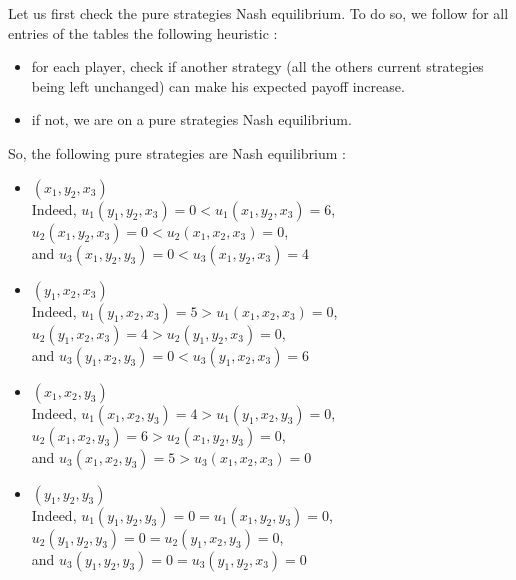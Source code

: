 
Let us first check the pure strategies Nash equilibrium. To do so, we follow for all entries of the tables the following heuristic :
\begin{itemize}
    \item for each player, check if another strategy (all the others current strategies being left unchanged) can make his expected payoff increase.
    \item if not, we are on a pure strategies Nash equilibrium.
\end{itemize}
So, the following pure strategies are Nash equilibrium :
\begin{itemize}
    \item {$(x_1, y_2, x_3) $ \\
    Indeed, $u_1(y_1, y_2, x_3) = 0 < u_1(x_1, y_2, x_3) = 6 $,
    \\ $u_2(x_1, y_2, x_3) = 0 < u_2(x_1, x_2, x_3)= 0 $, \\
    and $u_3(x_1, y_2, y_3) = 0 < u_3(x_1, y_2, x_3) = 4 $}
    \item {$(y_1, x_2, x_3) $ \\
    Indeed, $u_1(y_1, x_2, x_3) = 5 > u_1(x_1, x_2, x_3) = 0 $,
    \\ $u_2(y_1, x_2, x_3) = 4 > u_2(y_1, y_2, x_3)= 0 $, \\
    and $u_3(y_1, x_2, y_3) = 0 < u_3(y_1, x_2, x_3) = 6 $}
    \item {$(x_1, x_2, y_3) $ \\
    Indeed, $u_1(x_1, x_2, y_3) = 4 > u_1(y_1, x_2, y_3) = 0 $,
    \\ $u_2(x_1, x_2, y_3) = 6 > u_2(x_1, y_2, y_3)= 0 $, \\
    and $u_3(x_1, x_2, y_3) = 5 > u_3(x_1, x_2, x_3) = 0 $}
    \item {$(y_1, y_2, y_3) $ \\
    Indeed, $u_1(y_1, y_2, y_3) = 0 = u_1(x_1, y_2, y_3) = 0 $,
    \\ $u_2(y_1, y_2, y_3) = 0 = u_2(y_1, x_2, y_3)= 0 $, \\
    and $u_3(y_1, y_2, y_3) = 0 = u_3(y_1, y_2, x_3) = 0 $}
\end{itemize}


